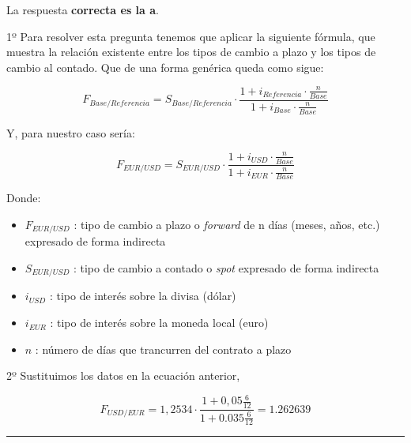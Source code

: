 \documentclass[
  letterpaper,
  DIV=11,
  numbers=noendperiod]{scrreprt}
\providecommand{\tightlist}{%
  \setlength{\itemsep}{0pt}\setlength{\parskip}{0pt}}\usepackage{longtable,booktabs,array}
\begin{document}
\begin{tcolorbox}[enhanced jigsaw, left=2mm, opacityback=0, colback=white, breakable, arc=.35mm, bottomrule=.15mm, rightrule=.15mm, toprule=.15mm, leftrule=.75mm, colframe=quarto-callout-tip-color-frame]
\begin{minipage}[t]{5.5mm}
\textcolor{quarto-callout-tip-color}{\faLightbulb}
\end{minipage}%
\begin{minipage}[t]{\textwidth - 5.5mm}

La respuesta \textbf{correcta es la a}.

1º Para resolver esta pregunta tenemos que aplicar la siguiente fórmula,
que muestra la relación existente entre los tipos de cambio a plazo y
los tipos de cambio al contado. Que de una forma genérica queda como
sigue:

\[{ F }_{ Base/Referencia }={ S }_{ Base/Referencia }\cdot \frac { 1+{ i }_{ Referencia }\cdot \frac { n }{ Base }  }{ 1+{ i }_{ Base }\cdot \frac { n }{ Base }  } \]

Y, para nuestro caso sería:

\[{ F }_{ EUR/USD }={ S }_{ EUR/USD }\cdot \frac { 1+{ i }_{ USD }\cdot\frac { n }{ Base }  }{ 1+{ i }_{ EUR }\cdot \frac { n }{ Base }  } \]

Donde:

\begin{itemize}
\tightlist
\item
  \({ F }_{ EUR/USD }\) : tipo de cambio a plazo o \emph{forward} de n
  días (meses, años, etc.) expresado de forma indirecta
\item
  \({ S }_{ EUR/USD }\) : tipo de cambio a contado o \emph{spot}
  expresado de forma indirecta
\item
  \({ i }_{USD}\) : tipo de interés sobre la divisa (dólar)
\item
  \({ i }_{EUR}\) : tipo de interés sobre la moneda local (euro)
\item
  \(n\) : número de días que trancurren del contrato a plazo
\end{itemize}

2º Sustituimos los datos en la ecuación anterior,

\[ { F }_{ USD/EUR }=1,2534\cdot \frac { 1+0,05\frac { 6 }{ 12 }  }{ 1+0.035\frac { 6 }{ 12 }  }=1.262639 \]

\end{minipage}%
\end{tcolorbox}

\begin{center}\rule{0.5\linewidth}{0.5pt}\end{center}
\end{document}
